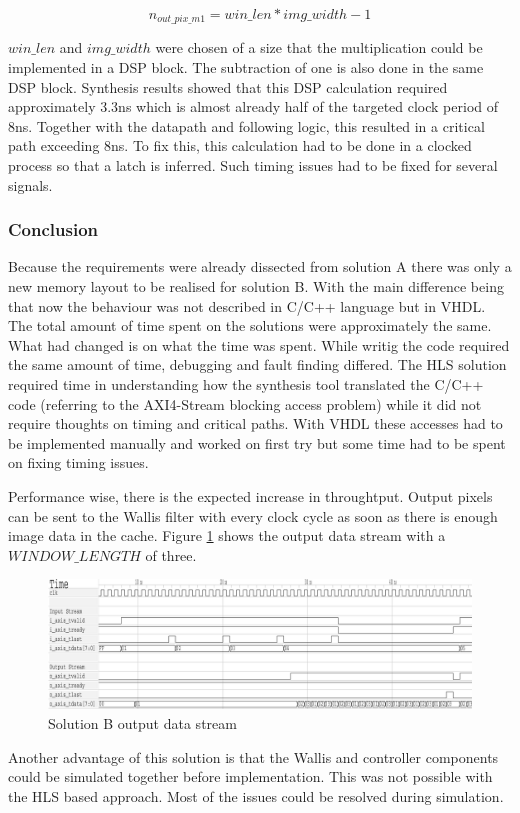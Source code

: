 \begin{equation}
    n_{out\_pix\_m1} = win\_len*img\_width - 1
    \label{eq:noutpix}
\end{equation}

$win\_len$ and $img\_width$ were chosen of a size that the multiplication could
be implemented in a DSP block. The subtraction of one is also done in the same
DSP block. Synthesis results showed that this DSP calculation required
approximately 3.3ns
which is almost already half of the targeted clock period of 8ns. Together with
the datapath and following logic, this resulted in a critical path exceeding
8ns. To fix this,
this calculation had to be done in a clocked process so that a latch is
inferred. Such timing issues had to be fixed for several signals.

% 
\subsubsection*{Conclusion}
Because the requirements were already dissected from solution A there was only a
new memory layout to be realised for solution B. With the main difference being
that now the behaviour was not described in C/C++ language but in VHDL. The
total
amount of time spent on the solutions were approximately the same. What had
changed is on what the time was spent. While writig the code required the same
amount of time, debugging and fault finding differed. The HLS solution required
time in understanding how the synthesis tool translated the C/C++ code (referring
to the AXI4-Stream blocking access problem) while it did not require thoughts on
timing
and critical paths. With VHDL these accesses had to be implemented manually and
worked on first try but some time had to be spent on fixing timing issues.

Performance wise, there is the expected increase in throughtput. Output pixels
can be sent to the Wallis filter with every clock cycle as soon as there is
enough image data in the cache. Figure \ref{fig:tracesolb} shows the output data
stream with a $WINDOW\_LENGTH$ of three. 

\begin{figure}[tb!]
    \centering
    \includegraphics[width=\textwidth]{images/controller/vhdlcontrollerout.png}
    \caption{Solution B output data stream}
    \label{fig:tracesolb}
\end{figure}

Another advantage of this solution is that the Wallis and controller components
could be simulated together before implementation. This was not possible with
the HLS based approach. Most of the issues could be resolved during simulation.



